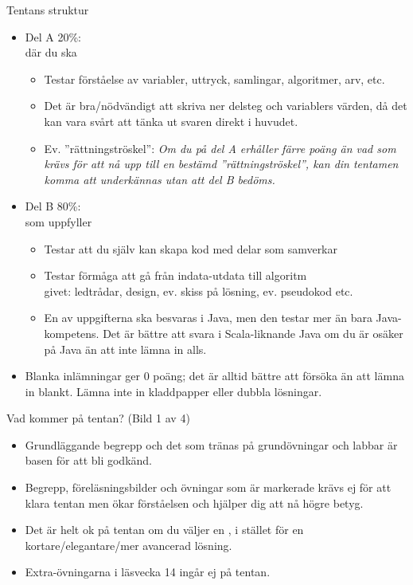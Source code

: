 \begin{Slide}{Tentans struktur}
\begin{itemize}\SlideFontSmall
\item Del A 20\%:\\ där du ska 
\begin{itemize}\SlideFontTiny
\item Testar förståelse av variabler, uttryck, samlingar, algoritmer, arv, etc.
\item Det är bra/nödvändigt att skriva ner delsteg och variablers värden, då det kan vara svårt att tänka ut svaren direkt i huvudet.
\item Ev. ''rättningströskel'': \textit{Om du på del A erhåller färre poäng än vad som krävs för att nå upp till en bestämd ''rättningströskel'', kan din tentamen komma att underkännas utan att del B bedöms.}
\end{itemize}


\item Del B 80\%:\\ som uppfyller 
\begin{itemize}\SlideFontTiny
\item Testar att du själv kan skapa kod med delar som samverkar
\item Testar förmåga att gå från indata-utdata till algoritm \\
 givet: ledtrådar, design, ev. skiss på lösning, ev. pseudokod etc.
\item En av uppgifterna ska besvaras i Java, men den testar mer än bara Java-kompetens. Det är bättre att svara i Scala-liknande Java om du är osäker på Java än att inte lämna in alls.
\end{itemize}
\item Blanka inlämningar ger 0 poäng; det är alltid bättre att försöka än att lämna in blankt. Lämna inte in kladdpapper eller dubbla lösningar.
\end{itemize}
\end{Slide}


\begin{Slide}{Vad kommer på tentan? (Bild 1 av 4)}
\begin{itemize}
\item Grundläggande begrepp och det som tränas på grundövningar och labbar är basen för att bli godkänd.
\item Begrepp, föreläsningsbilder och övningar som är markerade  krävs ej för att klara tentan men ökar förståelsen och hjälper dig att nå högre betyg.
\item Det är helt ok på tentan om du väljer en  , i stället för en kortare/elegantare/mer avancerad lösning.
\item Extra-övningarna i läsvecka 14 ingår ej på tentan.
\end{itemize}
\end{Slide}




